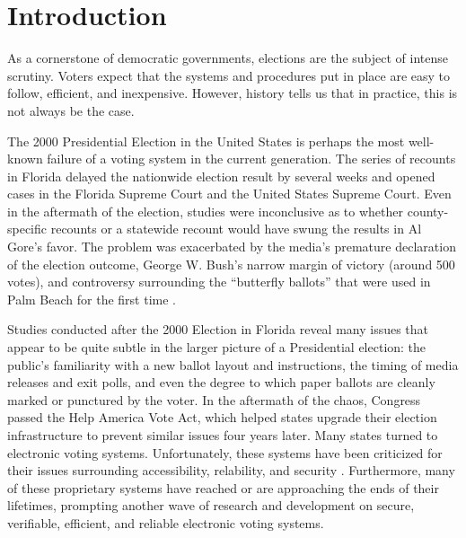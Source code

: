 \chapter{Introduction} \label{intro}

As a cornerstone of democratic governments, elections are the subject of intense scrutiny. Voters expect that the systems and procedures put in place are easy to follow, efficient, and inexpensive. However, history tells us that in practice, this is not always be the case.

The 2000 Presidential Election in the United States is perhaps the most well-known failure of a voting system in the current generation. The series of recounts in Florida delayed the nationwide election result by several weeks and opened cases in the Florida Supreme Court and the United States Supreme Court. Even in the aftermath of the election, studies were inconclusive as to whether county-specific recounts or a statewide recount would have swung the results in Al Gore's favor. The problem was exacerbated by the media's premature declaration of the election outcome, George W. Bush's narrow margin of victory (around 500 votes), and controversy surrounding the ``butterfly ballots'' that were used in Palm Beach for the first time \cite{wiki:2000-fl-pres}.

Studies conducted after the 2000 Election in Florida reveal many issues that appear to be quite subtle in the larger picture of a Presidential election: the public's familiarity with a new ballot layout and instructions, the timing of media releases and exit polls, and even the degree to which paper ballots are cleanly marked or punctured by the voter. In the aftermath of the chaos, Congress passed the Help America Vote Act, which helped states upgrade their election infrastructure to prevent similar issues four years later. Many states turned to electronic voting systems. Unfortunately, these systems have been criticized for their issues surrounding accessibility, relability, and security \cite{wiki:dre}. Furthermore, many of these proprietary systems have reached or are approaching the ends of their lifetimes, prompting another wave of research and development on secure, verifiable, efficient, and reliable electronic voting systems.

